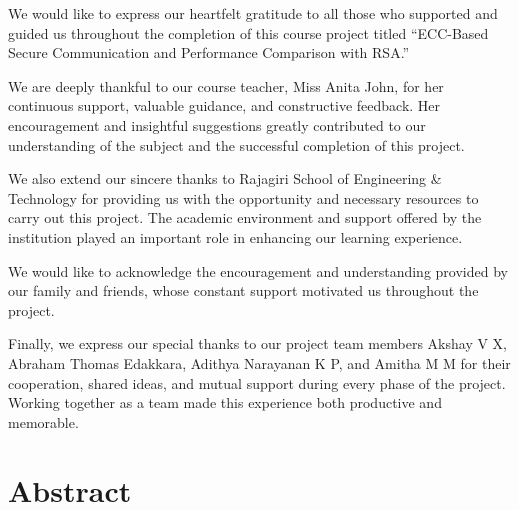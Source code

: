 \documentclass[12pt, a4paper]{report}
\begin{document}
\begin{onehalfspacing}
We would like to express our heartfelt gratitude to all those who supported and guided us throughout the completion of this course project titled “ECC-Based Secure Communication and Performance Comparison with RSA.”

We are deeply thankful to our course teacher, Miss Anita John, for her continuous support, valuable guidance, and constructive feedback. Her encouragement and insightful suggestions greatly contributed to our understanding of the subject and the successful completion of this project.

We also extend our sincere thanks to Rajagiri School of Engineering & Technology for providing us with the opportunity and necessary resources to carry out this project. The academic environment and support offered by the institution played an important role in enhancing our learning experience.

We would like to acknowledge the encouragement and understanding provided by our family and friends, whose constant support motivated us throughout the project.

Finally, we express our special thanks to our project team members Akshay V X, Abraham Thomas Edakkara, Adithya Narayanan K P, and Amitha M M for their cooperation, shared ideas, and mutual support during every phase of the project. Working together as a team made this experience both productive and memorable.
\end{onehalfspacing}

\clearpage

\chapter*{Abstract}
\end{document}
